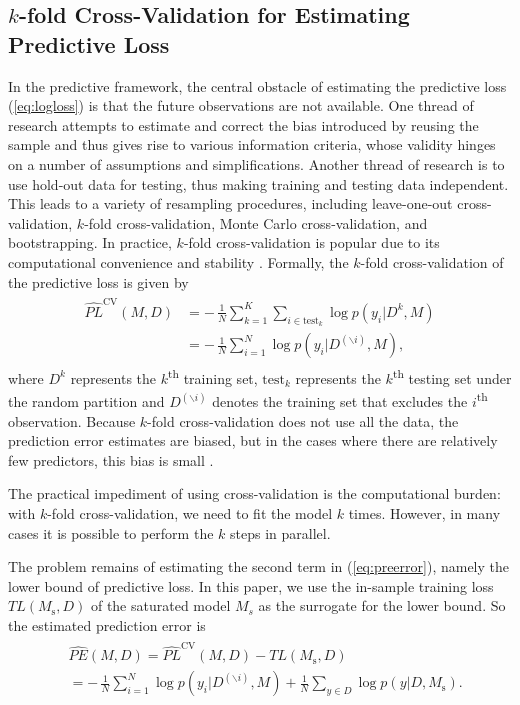 \documentclass[sii]{ipart}
\begin{document}
\subsection{$k$-fold Cross-Validation for Estimating  Predictive Loss}
In the predictive framework, the central obstacle of estimating the predictive
loss (\ref{eq:logloss}) is that the future observations are not available. One
thread of research attempts to estimate and correct the bias introduced by
reusing the sample and thus gives rise to various information criteria, whose
validity hinges on a number of assumptions and simplifications. Another thread of
research is to use hold-out data for testing, thus making training and testing
data independent. This leads to a variety of resampling procedures, including
leave-one-out cross-validation, $k$-fold cross-validation, Monte Carlo
cross-validation, and bootstrapping. In practice, $k$-fold cross-validation is
popular due to its computational convenience and stability
\citep{kale2011cross}. Formally, the $k$-fold cross-validation of the predictive
loss is given by
\begin{align}
\begin{split}
  \label{eq:xvalesti}
  \widehat{PL}^{\text{CV}}(M, D) &=-\,\frac{1}{N}\sum_{k=1}^K\sum_{i\in
    \text{test}_k}\log p(y_i|D^k, M)\\
  &=-\,\frac{1}{N}\sum_{i=1}^N\log
  p(y_i|D^{(\backslash i)}, M),
\end{split}
\end{align}
where $D^k$ represents the $k$\textsuperscript{th} training set, $\text{test}_k$
represents the $k$\textsuperscript{th} testing set under the random partition and
$D^{(\backslash i)}$ denotes the training set that excludes the
$i$\textsuperscript{th} observation. Because $k$-fold cross-validation does not
use all the data, the prediction error estimates are biased, but in the cases
where there are relatively few predictors, this bias is small
\citep{burman1989comparative}.

The practical impediment of using cross-validation is the computational burden:
with $k$-fold cross-validation, we need to fit the model $k$ times.  However, in
many cases it is possible to perform the $k$ steps in parallel.

The problem remains of estimating the second term in (\ref{eq:preerror}), namely
the lower bound of predictive loss. In this paper, we use the in-sample training
loss $TL(M_{\text{s}}, D)$ of the saturated model $M_s$ as the surrogate for the
lower bound. So the estimated prediction error is
\begin{align}
\begin{split}
  \label{eq:esti_preerror}
  &\widehat{PE}(M, D)=\widehat{PL}^{\text{CV}}(M,D)-TL(M_{\text{s}},D)\\
  &= -\,\frac{1}{N}\sum_{i=1}^N\log p(y_i|D^{(\backslash i)},
  M)+\frac{1}{N}\sum_{y\in D}\log p(y | D, M_{\text{s}}).
\end{split}
\end{align}
\end{document}
